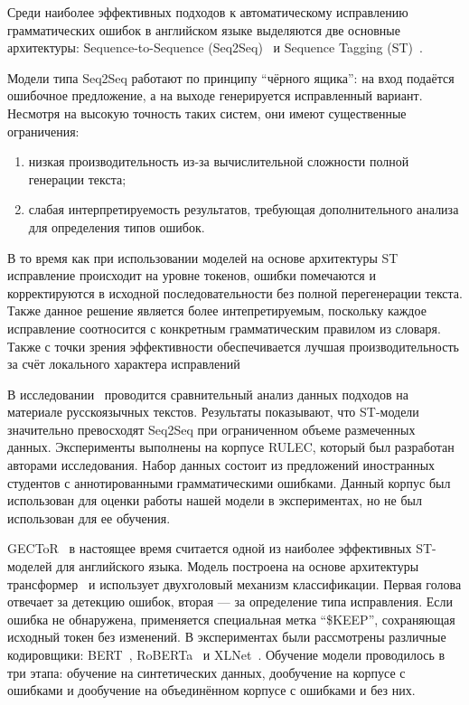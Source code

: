 Среди наиболее эффективных подходов к автоматическому исправлению грамматических ошибок в английском языке выделяются две основные архитектуры: Sequence-to-Sequence (Seq2Seq)~\cite{b13, b14} и Sequence Tagging (ST)~\cite{b15, b16}.

Модели типа Seq2Seq работают по принципу “чёрного ящика”: на вход подаётся ошибочное предложение, а на выходе генерируется исправленный вариант. Несмотря на высокую точность таких систем, они имеют существенные ограничения:

\begin{enumerate}
    \item низкая производительность из-за вычислительной сложности полной генерации текста;
    
    \item слабая интерпретируемость результатов, требующая дополнительного анализа для определения типов ошибок.
\end{enumerate}

В то время как при использовании моделей на основе архитектуры ST исправление происходит на уровне токенов, ошибки помечаются и корректируются в исходной последовательности без полной перегенерации текста. Также данное решение является более интепретируемым, поскольку каждое исправление соотносится с конкретным грамматическим правилом из словаря. Также с точки зрения эффективности обеспечивается лучшая производительность за счёт локального характера исправлений

В исследовании~\cite{b12} проводится сравнительный анализ данных подходов на материале русскоязычных текстов. Результаты показывают, что ST-модели значительно превосходят Seq2Seq при ограниченном объеме размеченных данных. Эксперименты выполнены на корпусе RULEC, который был разработан авторами исследования. Набор данных состоит из предложений иностранных студентов с аннотированными грамматическими ошибками. Данный корпус был использован для оценки работы нашей модели в экспериментах, но не был использован для ее обучения. 


GECToR~\cite{b15} в настоящее время считается одной из наиболее эффективных ST-моделей для английского языка. Модель построена на основе архитектуры трансформер~\cite{b17} и использует двухголовый механизм классификации. Первая голова отвечает за детекцию ошибок, вторая — за определение типа исправления. Если ошибка не обнаружена, применяется специальная метка “\$KEEP”, сохраняющая исходный токен без изменений. В экспериментах были рассмотрены различные кодировщики: BERT~\cite{b18}, RoBERTa~\cite{b19} и XLNet~\cite{b20}. Обучение модели проводилось в три этапа: обучение на синтетических данных, дообучение на корпусе с ошибками и дообучение на объединённом корпусе с ошибками и без них.


